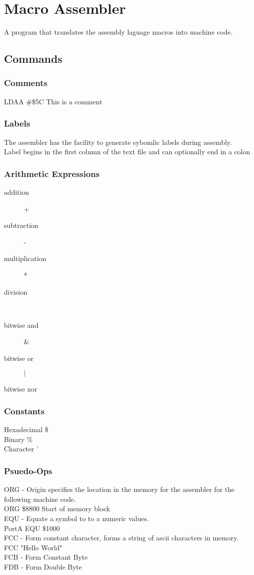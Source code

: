 \section{Macro Assembler}
	A program that translates the assembly laguage macros into machine code.
	\subsection{Commands}
		\subsubsection{Comments}
			LDAA \#\$5C This is a comment
		\subsubsection{Labels}
			The assembler has the facility to generate sybomlic labels during assembly. \\
			Label begins in the first column of the text file and can optionally end in a colon
		\subsubsection{Arithmetic Expressions}
			\begin{description}
				\item[addition] +
				\item[subtraction] -
				\item[multiplication] *
				\item[division] \
				\item[bitwise and] \&
				\item[bitwise or] $|$
				\item[bitwise xor] 
			\end{description}
		\subsubsection{Constants}
			Hexadecimal \$\\
			Binary \%\\
			Character '
		\subsubsection{Psuedo-Ops}
			ORG - Origin specifies the location in the memory for the assembler for the following machine code. \\
			ORG \$8800 Start of memory block \\
			EQU  - Equate a symbol to to a numeric values. \\
			PortA EQU \$1000 \\
			FCC - Form constant character, forms a string of ascii characters in memory. \\
			FCC "Hello World" \\
			FCB - Form Constant Byte \\
			FDB - Form Double Byte \\
